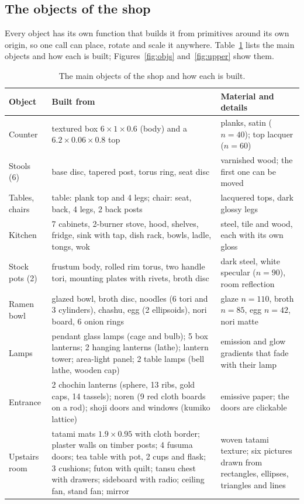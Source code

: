 \documentclass[10pt,a4paper]{article}
\begin{document}
\subsection{The objects of the shop}
Every object has its own function that builds it from primitives around its own origin, so one call can place, rotate and scale it anywhere. Table~\ref{tab:objects} lists the main objects and how each is built; Figures~\ref{fig:objs} and~\ref{fig:upper} show them.
\begin{table}[htbp]
\centering\footnotesize
\begin{tabular}{@{}p{2.5cm}p{7.4cm}p{5.9cm}@{}}
\toprule
\textbf{Object} & \textbf{Built from} & \textbf{Material and details}\\
\midrule
Counter & textured box $6\times1\times0.6$ (body) and a $6.2\times0.06\times0.8$ top & planks, satin ($n=40$); top lacquer ($n=60$)\\
Stools (6) & base disc, tapered post, torus ring, seat disc & varnished wood; the first one can be moved\\
Tables, chairs & table: plank top and 4 legs; chair: seat, back, 4 legs, 2 back posts & lacquered tops, dark glossy legs\\
Kitchen & 7 cabinets, 2-burner stove, hood, shelves, fridge, sink with tap, dish rack, bowls, ladle, tongs, wok & steel, tile and wood, each with its own gloss\\
Stock pots (2) & frustum body, rolled rim torus, two handle tori, mounting plates with rivets, broth disc & dark steel, white specular ($n=90$), room reflection\\
Ramen bowl & glazed bowl, broth disc, noodles (6 tori and 3 cylinders), chashu, egg (2 ellipsoids), nori board, 6 onion rings & glaze $n=110$, broth $n=85$, egg $n=42$, nori matte\\
Lamps & pendant glass lamps (cage and bulb); 5 box lanterns; 2 hanging lanterns (lathe); lantern tower; area-light panel; 2 table lamps (bell lathe, wooden cap) & emission and glow gradients that fade with their lamp\\
Entrance & 2 chochin lanterns (sphere, 13 ribs, gold caps, 14 tassels); noren (9 red cloth boards on a rod); shoji doors and windows (kumiko lattice) & emissive paper; the doors are clickable\\
Upstairs room & tatami mats $1.9\times0.95$ with cloth border; plaster walls on timber posts; 4 fusuma doors; tea table with pot, 2 cups and flask; 3 cushions; futon with quilt; tansu chest with drawers; sideboard with radio; ceiling fan, stand fan; mirror & woven tatami texture; six pictures drawn from rectangles, ellipses, triangles and lines\\
\bottomrule
\end{tabular}
\caption{The main objects of the shop and how each is built.}\label{tab:objects}
\end{table}
\end{document}
